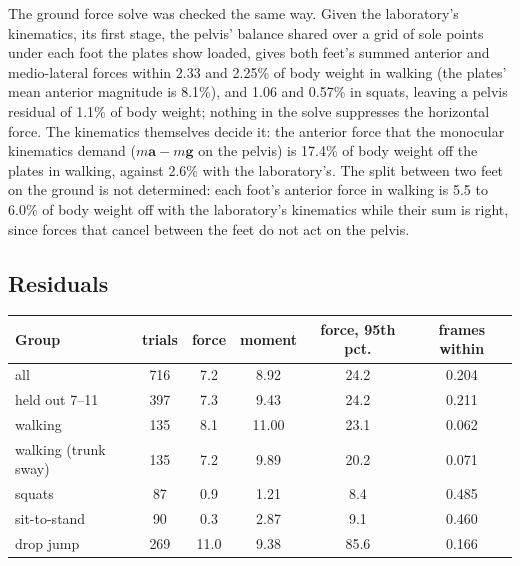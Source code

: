 \documentclass[11pt]{article}
\begin{document}
The ground force solve was checked the same way. Given the laboratory's kinematics, its first stage, the pelvis'
balance shared over a grid of sole points under each foot the plates show loaded, gives both feet's summed anterior
and medio-lateral forces within 2.33 and 2.25\% of body weight in walking (the plates' mean anterior magnitude is 8.1\%), and
1.06 and 0.57\% in squats, leaving a pelvis residual of 1.1\% of body weight; nothing in the solve suppresses the
horizontal force. The kinematics themselves decide it: the anterior force that the monocular kinematics demand
($m\mathbf{a} - m\mathbf{g}$ on the pelvis) is 17.4\% of body weight off the plates in walking, against 2.6\% with
the laboratory's. The split between two feet on the ground is not determined: each foot's anterior force in walking
is 5.5 to 6.0\% of body weight off with the laboratory's kinematics while their sum is right, since forces that
cancel between the feet do not act on the pelvis.

\subsection{Residuals}
\begin{center}\small
{}
\begin{tabular}{@{}lccccc@{}}
\toprule
Group & trials & force & moment & force, 95th pct. & frames within \\
\midrule
all & 716 & 7.2 & 8.92 & 24.2 & 0.204 \\
held out 7--11 & 397 & 7.3 & 9.43 & 24.2 & 0.211 \\
walking & 135 & 8.1 & 11.00 & 23.1 & 0.062 \\
walking (trunk sway) & 135 & 7.2 & 9.89 & 20.2 & 0.071 \\
squats & 87 & 0.9 & 1.21 & 8.4 & 0.485 \\
sit-to-stand & 90 & 0.3 & 2.87 & 9.1 & 0.460 \\
drop jump & 269 & 11.0 & 9.38 & 85.6 & 0.166 \\
\bottomrule
\end{tabular}
\end{center}
\end{document}
